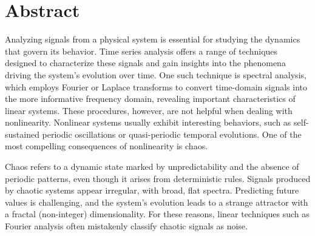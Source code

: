 \chapter*{Abstract}

Analyzing signals from a physical system is essential for studying the dynamics that govern its behavior. Time series analysis offers a range of techniques designed to characterize these signals and gain insights into the phenomena driving the system's evolution over time. One such technique is spectral analysis, which employs Fourier or Laplace transforms to convert time-domain signals into the more informative frequency domain, revealing important characteristics of linear systems.
These procedures, however, are not helpful when dealing with nonlinearity.
Nonlinear systems usually exhibit interesting behaviors, such as self-sustained periodic oscillations
or quasi-periodic temporal evolutions. One of the most compelling consequences of nonlinearity is chaos.

Chaos refers to a dynamic state marked by unpredictability and the absence of periodic patterns, even though it arises from deterministic rules. Signals produced by chaotic systems appear irregular, with broad, flat spectra. Predicting future values is challenging, and the system's evolution leads to a strange attractor with a fractal (non-integer) dimensionality.
For these reasons, linear techniques such as Fourier analysis often mistakenly classify chaotic signals
as noise.


